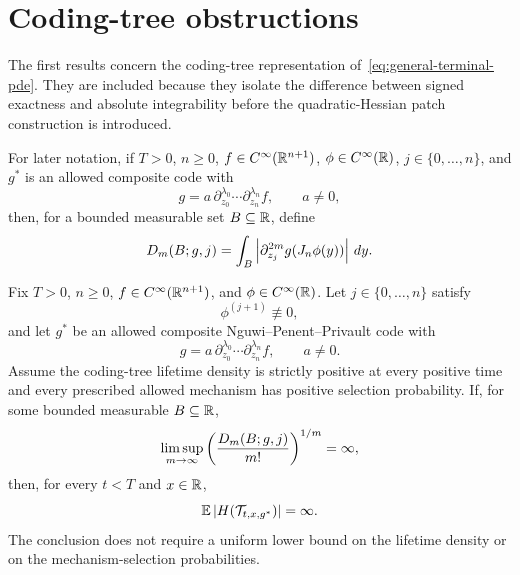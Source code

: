 \section{Coding-tree obstructions}
\label{sec:coding-tree}

The first results concern the coding-tree representation of~\eqref{eq:general-terminal-pde}. They are included because they isolate the difference between signed exactness and absolute integrability before the quadratic-Hessian patch construction is introduced.

For later notation, if $T>0$, $n\geq0$, $f\in C^\infty(\mathbb R^{n+1})$, $\phi\in C^\infty(\mathbb R)$, $j\in\{0,\ldots,n\}$, and $g^*$ is an allowed composite code with
\begin{equation*}
  g
  =
  a\,\partial_{z_0}^{\lambda_0}\cdots
  \partial_{z_n}^{\lambda_n}f,
  \qquad a\neq0,
\end{equation*}
then, for a bounded measurable set $B\subseteq\mathbb R$, define
\begin{equation}
  D_m(B;g,j)
  =
  \int_B
  \left|\partial_{z_j}^{2m}g(J_n\phi(y))\right|\,dy.
  \label{eq:Dm}
\end{equation}

\begin{theorem}
\label{thm:repeated-hessian}
Fix $T>0$, $n\geq0$, $f\in C^\infty(\mathbb R^{n+1})$, and $\phi\in C^\infty(\mathbb R)$. Let $j\in\{0,\ldots,n\}$ satisfy
\begin{equation*}
  \phi^{(j+1)}\not\equiv0,
\end{equation*}
and let $g^*$ be an allowed composite Nguwi--Penent--Privault code with
\begin{equation*}
  g
  =
  a\,\partial_{z_0}^{\lambda_0}\cdots
  \partial_{z_n}^{\lambda_n}f,
  \qquad a\neq0.
\end{equation*}
Assume the coding-tree lifetime density is strictly positive at every positive time and every prescribed allowed mechanism has positive selection probability. If, for some bounded measurable $B\subseteq\mathbb R$,
\begin{equation}
  \limsup_{m\to\infty}
  \left(
    \frac{D_m(B;g,j)}{m!}
  \right)^{1/m}
  =\infty,
  \label{eq:repeated-hessian-condition}
\end{equation}
then, for every $t<T$ and $x\in\mathbb R$,
\begin{equation*}
  \mathbb E\left|H(\mathcal T_{t,x,g^*})\right|
  =\infty.
\end{equation*}
The conclusion does not require a uniform lower bound on the lifetime density or on the mechanism-selection probabilities.
\end{theorem}

